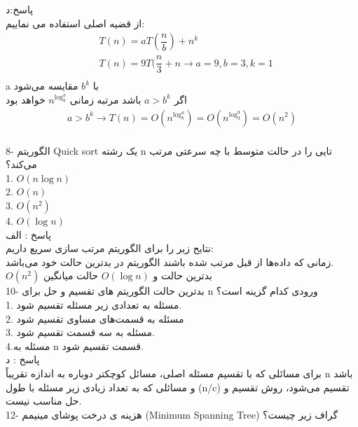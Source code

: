 \documentclass{book}
\begin{document}
پاسخ:د\\
از قضیه اصلی استفاده می نماییم:\\
\begin{align*}
&T(n)=aT(\dfrac{n}{b})+n^k\\
&T(n)=9T(\dfrac{n}{3}+n \to a=9 , b=3 , k=1\\
\end{align*}
a با $b^k$ مقایسه می‌شود\\
اگر $a>b^k$ باشد مرتبه زمانی $n^{\log ^a_b}$ خواهد بود\\
\begin{align*}
a>b^k \to T(n)=O(n^{\log ^a_b})=O(n^{\log ^9_3})=O(n^2)\\
\end{align*}

8- الگوریتم Quick sort یک رشته n تایی را در حالت متوسط با چه سرعتی مرتب می‌کند؟\\

1. $O(n\log n)$\\
2. $O(n)$\\
3. $O(n^2)$\\
4. $O(\log n) $ \\

پاسخ : الف\\
نتایح زیر را برای الگوریتم مرتب سازی سریع داریم:\\
زمانی که داده‌ها از قبل مرتب شده باشند الگوریتم در بدترین حالت خود می‌باشد.\\
$O(n^2)$ بدترین حالت و $O(\log n) $  حالت میانگین\\

10- بدترین حالت الگوریتم های تقسیم و حل برای n ورودی کدام گزینه است؟\\

1. مسئله به تعدادی زیر مسئله تقسیم شود.\\
2. مسئله به قسمت‌های مساوی تقسیم شود\\
3. مسئله به سه قسمت تقسیم شود.\\
4.مسئله به n قسمت تقسیم شود.\\

پاسخ : د\\
برای مسائلی که با تقسیم مسئله اصلی، مسائل کوچکتر دوباره به اندازه تقریباً n باشد و مسائلی که به تعداد زیادی زیر مسئله با طول (n/c) تقسیم می‌شود، روش تقسیم و حل مناسب نیست.\\

12- هزینه ی درخت پوشای مینیمم (Minimum Spanning Tree) گراف زیر چیست؟\\
\end{document}
